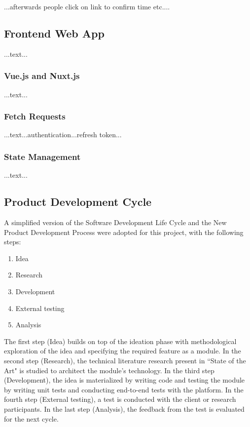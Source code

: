 \documentclass{article}
\begin{document}
...afterwards people click on link to confirm time etc....

\subsection{Frontend Web App}

...text...

\subsubsection{Vue.js and Nuxt.js}

...text...

\subsubsection{Fetch Requests}

...text...authentication...refresh token...

\subsubsection{State Management}

...text...

\subsection{Product Development Cycle}

A simplified version of the Software Development Life Cycle and the New Product Development Process were adopted for this project, with the following steps:

\begin{enumerate}
	\item Idea
	\item Research
	\item Development
	\item External testing
	\item Analysis
\end{enumerate}

The first step (Idea) builds on top of the ideation phase with methodological exploration of the idea and specifying the required feature as a module. In the second step (Research), the technical literature research present in ``State of the Art" is studied to architect the module's technology. In the third step (Development), the idea is materialized by writing code and testing the module by writing unit tests and conducting end-to-end tests with the platform. In the fourth step (External testing), a test is conducted with the client or research participants. In the last step (Analysis), the feedback from the test is evaluated for the next cycle.
\end{document}
